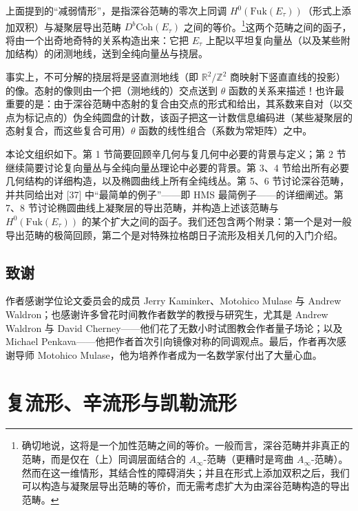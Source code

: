 \documentclass[11pt,a4paper]{article}
\theoremstyle{plain}
\theoremstyle{definition}
\begin{document}
上面提到的“减弱情形”，是指深谷范畴的零次上同调 $H^0(\mathrm{Fuk}(E_\tau))$（形式上添加双积）与凝聚层导出范畴 $D^b\mathrm{Coh}(E_\tau)$ 之间的等价。\footnote{确切地说，这将是一个加性范畴之间的等价。一般而言，深谷范畴并非真正的范畴，而是仅在（上）同调层面结合的 $A_\infty$-范畴（更糟时是弯曲 $A_\infty$-范畴）。然而在这一维情形，其结合性的障碍消失；并且在形式上添加双积之后，我们可以构造与凝聚层导出范畴的等价，而无需考虑扩大为由深谷范畴构造的导出范畴。}这两个范畴之间的函子，将由一个出奇地奇特的关系构造出来：它把 $E_\tau$ 上配以平坦复向量丛（以及某些附加结构）的闭测地线，送到全纯向量丛与挠层。

事实上，不可分解的挠层将是竖直测地线（即 $\mathbb{R}^2/\mathbb{Z}^2$ 商映射下竖直直线的投影）的像。态射的像则由一个把（测地线的）交点送到 $\theta$ 函数的关系来描述！也许最重要的是：由于深谷范畴中态射的复合由交点的形式和给出，其系数来自对（以交点为标记点的）伪全纯圆盘的计数，该函子把这一计数信息编码进（某些凝聚层的态射复合，而这些复合可用）$\theta$ 函数的线性组合（系数为常矩阵）之中。

本论文组织如下。第 1 节简要回顾辛几何与复几何中必要的背景与定义；第 2 节继续简要讨论复向量丛与全纯向量丛理论中必要的背景。第 3、4 节给出所有必要几何结构的详细构造，以及椭圆曲线上所有全纯线丛。第 5、6 节讨论深谷范畴，并共同给出对 [37] 中“最简单的例子”——即 HMS 最简例子——的详细阐述。第 7、8 节讨论椭圆曲线上凝聚层的导出范畴，并构造上述该范畴与 $H^0(\mathrm{Fuk}(E_\tau))$ 的某个扩大之间的函子。我们还包含两个附录：第一个是对一般导出范畴的极简回顾，第二个是对特殊拉格朗日子流形及相关几何的入门介绍。

\subsection*{致谢}

作者感谢学位论文委员会的成员 Jerry Kaminker、Motohico Mulase 与 Andrew Waldron；也感谢许多曾花时间教作者数学的教授与研究生，尤其是 Andrew Waldron 与 David Cherney——他们花了无数小时试图教会作者量子场论；以及 Michael Penkava——他把作者首次引向镜像对称的同调观点。最后，作者再次感谢导师 Motohico Mulase，他为培养作者成为一名数学家付出了大量心血。

\section{复流形、辛流形与凯勒流形}
\end{document}
